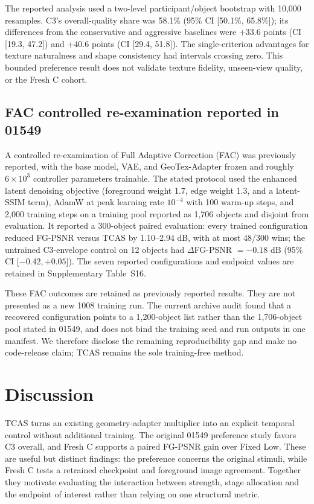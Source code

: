 \documentclass[times,twocolumn,final]{elsarticle}
\begin{document}
The reported analysis used a two-level participant/object bootstrap with 10,000 resamples. C3's overall-quality share was 58.1\% (95\% CI [50.1\%, 65.8\%]); its differences from the conservative and aggressive baselines were +33.6 points (CI [19.3, 47.2]) and +40.6 points (CI [29.4, 51.8]). The single-criterion advantages for texture naturalness and shape consistency had intervals crossing zero. This bounded preference result does not validate texture fidelity, unseen-view quality, or the Fresh C cohort.

\subsection{FAC controlled re-examination reported in 01549}
\label{subsec:facreported}

A controlled re-examination of Full Adaptive Correction (FAC) was previously reported, with the base model, VAE, and GeoTex-Adapter frozen and roughly $6\times10^3$ controller parameters trainable. The stated protocol used the enhanced latent denoising objective (foreground weight 1.7, edge weight 1.3, and a latent-SSIM term), AdamW at peak learning rate $10^{-4}$ with 100 warm-up steps, and 2,000 training steps on a training pool reported as 1,706 objects and disjoint from evaluation. It reported a 300-object paired evaluation: every trained configuration reduced FG-PSNR versus TCAS by 1.10--2.94 dB, with at most 48/300 wins; the untrained C3-envelope control on 12 objects had $\Delta$FG-PSNR $=-0.18$ dB (95\% CI [$-0.42,+0.05$]). The seven reported configurations and endpoint values are retained in Supplementary Table~S16.

These FAC outcomes are retained as previously reported results. They are not presented as a new 1008 training run. The current archive audit found that a recovered configuration points to a 1,200-object list rather than the 1,706-object pool stated in 01549, and does not bind the training seed and run outputs in one manifest. We therefore disclose the remaining reproducibility gap and make no code-release claim; TCAS remains the sole training-free method.

\section{Discussion}
TCAS turns an existing geometry-adapter multiplier into an explicit temporal control without additional training. The original 01549 preference study favors C3 overall, and Fresh C supports a paired FG-PSNR gain over Fixed Low. These are useful but distinct findings: the preference concerns the original stimuli, while Fresh C tests a retrained checkpoint and foreground image agreement. Together they motivate evaluating the interaction between strength, stage allocation and the endpoint of interest rather than relying on one structural metric.
\end{document}
